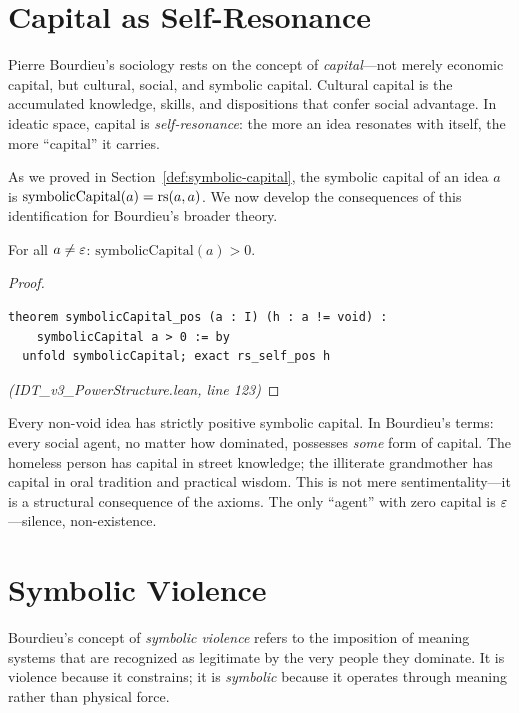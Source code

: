 \section{Capital as Self-Resonance}

Pierre Bourdieu's sociology rests on the concept of \emph{capital}---not merely
economic capital, but cultural, social, and symbolic capital. Cultural capital
is the accumulated knowledge, skills, and dispositions that confer social
advantage. In ideatic space, capital is \emph{self-resonance}: the more an idea
resonates with itself, the more ``capital'' it carries.

As we proved in Section~\ref{def:symbolic-capital}, the symbolic capital of an
idea $a$ is $\mathrm{symbolicCapital}(a) = \mathrm{rs}(a,a)$. We now develop the
consequences of this identification for Bourdieu's broader theory.

\begin{theorem}
\label{thm:capital-positive}
For all $a \neq \varepsilon$: $\mathrm{symbolicCapital}(a) > 0$.
\end{theorem}

\begin{proof}
\begin{lstlisting}
theorem symbolicCapital_pos (a : I) (h : a != void) :
    symbolicCapital a > 0 := by
  unfold symbolicCapital; exact rs_self_pos h
\end{lstlisting}
\textit{(IDT\_v3\_PowerStructure.lean, line 123)}
\end{proof}

\begin{interpretation}
Every non-void idea has strictly positive symbolic capital. In Bourdieu's terms:
every social agent, no matter how dominated, possesses \emph{some} form of
capital. The homeless person has capital in street knowledge; the illiterate
grandmother has capital in oral tradition and practical wisdom. This is not
mere sentimentality---it is a structural consequence of the axioms. The only
``agent'' with zero capital is $\varepsilon$---silence, non-existence.
\end{interpretation}

\section{Symbolic Violence}

Bourdieu's concept of \emph{symbolic violence} refers to the imposition of
meaning systems that are recognized as legitimate by the very people they
dominate. It is violence because it constrains; it is \emph{symbolic} because
it operates through meaning rather than physical force.

